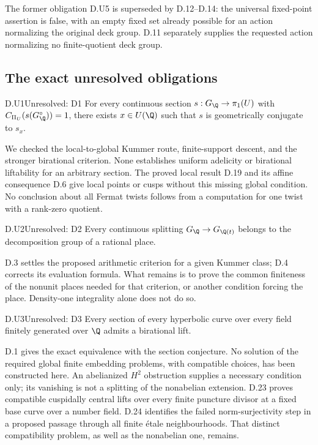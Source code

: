 

The former obligation D.U5 is superseded by D.12--D.14:
the universal fixed-point assertion is false, with an empty
fixed set already possible for an action normalizing the
original deck group. D.11 separately supplies the requested
action normalizing no finite-quotient deck group.








\subsection{The exact unresolved obligations}

\begin{claim}{D.U1}{Unresolved: D1}
For every continuous section $s:G_\Q\to\pi_1(U)$ with
$C_{\Pi_U}(s(G_\Q^\circ))=1$, there exists $x\in U(\Q)$
such that $s$ is geometrically conjugate to $s_x$.
\end{claim}
We checked the local-to-global Kummer route, finite-support descent,
and the stronger birational criterion. None establishes uniform
adelicity or birational liftability for an arbitrary section.
The proved local result D.19 and its affine consequence D.6 give
local points or cusps without this missing global condition.
No conclusion about all Fermat twists follows
from a computation for one twist with a rank-zero quotient.

\begin{claim}{D.U2}{Unresolved: D2}
Every continuous splitting $G_\Q\to G_{\Q(t)}$ belongs to the
decomposition group of a rational place.
\end{claim}
D.3 settles the proposed arithmetic criterion for a given Kummer
class; D.4 corrects its evaluation formula. What remains is to
prove the common finiteness of the nonunit places needed for that
criterion, or another condition forcing the place. Density-one
integrality alone does not do so.

\begin{claim}{D.U3}{Unresolved: D3}
Every section of every hyperbolic curve over every field finitely
generated over $\Q$ admits a birational lift.
\end{claim}
D.1 gives the exact equivalence with the section conjecture. No
solution of the required global finite embedding problems, with
compatible choices, has been constructed here. An abelianized
$H^2$ obstruction supplies a necessary condition only; its
vanishing is not a splitting of the nonabelian extension.
D.23 proves compatible cuspidally central lifts over every finite
puncture divisor at a fixed base curve over a number field.
D.24 identifies the failed norm-surjectivity step in a proposed
passage through all finite \'etale neighbourhoods. That distinct
compatibility problem, as well as the nonabelian one, remains.

